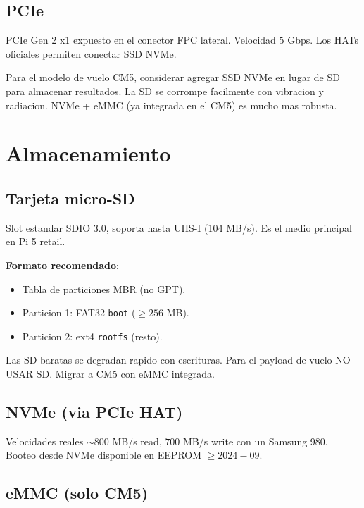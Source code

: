 \documentclass[11pt,a4paper,oneside]{report}
\begin{document}
\section{PCIe}

PCIe Gen 2 x1 expuesto en el conector FPC lateral. Velocidad $5$ Gbps. Los
HATs oficiales permiten conectar SSD NVMe.

\begin{nota}
Para el modelo de vuelo CM5, considerar agregar SSD NVMe en lugar de SD
para almacenar resultados. La SD se corrompe facilmente con vibracion y
radiacion. NVMe + eMMC (ya integrada en el CM5) es mucho mas robusta.
\end{nota}

\chapter{Almacenamiento}

\section{Tarjeta micro-SD}

Slot estandar SDIO 3.0, soporta hasta UHS-I (104 MB/s). Es el medio principal
en Pi 5 retail.

\textbf{Formato recomendado}:
\begin{itemize}[leftmargin=2em]
  \item Tabla de particiones MBR (no GPT).
  \item Particion 1: FAT32 \texttt{boot} ($\geq 256$ MB).
  \item Particion 2: ext4 \texttt{rootfs} (resto).
\end{itemize}

\begin{cuidado}
Las SD baratas se degradan rapido con escrituras. Para el payload de vuelo
NO USAR SD. Migrar a CM5 con eMMC integrada.
\end{cuidado}

\section{NVMe (via PCIe HAT)}

Velocidades reales $\sim 800$ MB/s read, $700$ MB/s write con un Samsung 980.
Booteo desde NVMe disponible en EEPROM $\geq 2024-09$.

\section{eMMC (solo CM5)}
\end{document}
